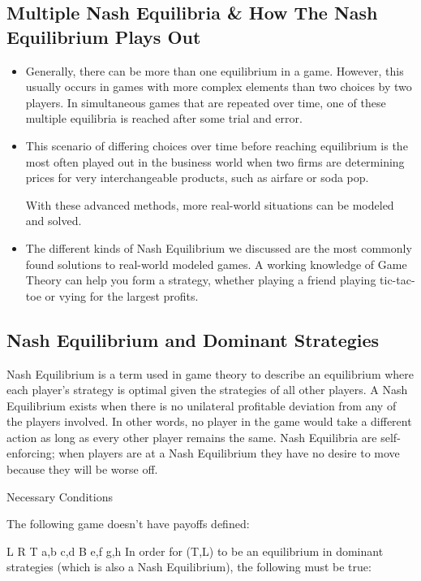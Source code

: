 \documentclass[a4paper,12pt]{article}
\begin{document}
\subsection{Multiple Nash Equilibria \& How The Nash Equilibrium Plays Out}
\begin{itemize}
\item Generally, there can be more than one equilibrium in a game. However, this usually occurs in games with more complex elements than two choices by two players. In simultaneous games that are repeated over time, one of these multiple equilibria is reached after some trial and error. 
\item This scenario of differing choices over time before reaching equilibrium is the most often played out in the business world when two firms are determining prices for very interchangeable products, such as airfare or soda pop.

With these advanced methods, more real-world situations can be modeled and solved. 
\item The different kinds of Nash Equilibrium we discussed are the most commonly found solutions to real-world modeled games. A working knowledge of Game Theory can help you form a strategy, whether playing a friend playing tic-tac-toe or vying for the largest profits.
\end{itemize}

\newpage


\subsection{Nash Equilibrium and Dominant Strategies}

Nash Equilibrium is a term used in game theory to describe an equilibrium where each player's strategy is optimal given the strategies of all other players. A Nash Equilibrium exists when there is no unilateral profitable deviation from any of the players involved. In other words, no player in the game would take a different action as long as every other player remains the same. Nash Equilibria are self-enforcing; when players are at a Nash Equilibrium they have no desire to move because they will be worse off.

Necessary Conditions

The following game doesn't have payoffs defined:

L	R
T	a,b	c,d
B	e,f	g,h
In order for (T,L) to be an equilibrium in dominant strategies (which is also a Nash Equilibrium), the following must be true:
\end{document}

